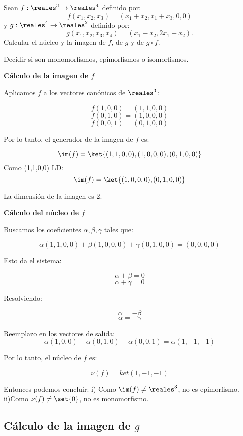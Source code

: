 \begin{enunciado}{\ejercicio}
  Sean $ f: \reales^3 \to \reales^4 $ definido por:
  $$
    f(x_1, x_2, x_3) = (x_1 + x_2, x_1 + x_3, 0, 0)
  $$
  y $ g: \reales^4 \to \reales^2 $ definido por:
  $$
    g(x_1, x_2, x_3, x_4) = (x_1 - x_2, 2x_1 - x_2).
  $$
  Calcular el núcleo y la imagen de $f$, de $g$ y de $g \circ f$.

  Decidir si son monomorfismos, epimorfismos o isomorfismos.
\end{enunciado}

\medskip

\textbf{Cálculo de la imagen de $f$}

Aplicamos $f$ a los vectores canónicos de $\reales^3$:

$$ f(1,0,0) = (1,1,0,0) $$
$$ f(0,1,0) = (1,0,0,0) $$
$$ f(0,0,1) = (0,1,0,0) $$

Por lo tanto, el generador de la imagen de $ f $ es:

$$ \im(f) = \ket{(1,1,0,0), (1,0,0,0), (0,1,0,0)} $$
Como (1,1,0,0) LD:
$$ \im(f) = \ket{(1,0,0,0), (0,1,0,0)} $$

La dimensión de la imagen es 2.

\medskip

\textbf{Cálculo del núcleo de $ f $}

Buscamos los coeficientes $ \alpha, \beta, \gamma $ tales que:

$$ \alpha(1,1,0,0) + \beta(1,0,0,0) + \gamma(0,1,0,0) = (0,0,0,0) $$

Esto da el sistema:

$$ \alpha + \beta = 0 $$
$$ \alpha + \gamma = 0 $$

Resolviendo:

$$ \alpha = -\beta $$
$$ \alpha = -\gamma $$

Reemplazo en los vectores de salida:
$$ \alpha(1,0,0) - \alpha(0,1,0) - \alpha(0,0,1) = \alpha(1,-1,-1) $$

Por lo tanto, el núcleo de $ f $ es:

$$ \nu(f) = ket{(1,-1,-1)} $$

Entonces podemos concluir:
\newline
i) Como $ \im(f) \neq \reales^3 $, no es epimorfismo.
\newline
ii)Como $ \nu(f) \neq \set{0} $, no es monomorfismo.

\subsection*{Cálculo de la imagen de $ g $}


